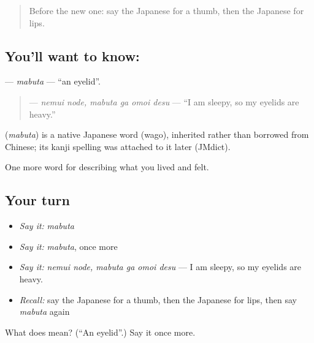 \label{lesson:JA-C443-mabuta}



\begin{quote}
Before the new one: say the Japanese for a thumb, then the Japanese for lips.
\end{quote}

\subsection*{You'll want to know: }
\textbf{} — \emph{mabuta} — \textquotedblleft{}an eyelid\textquotedblright{}.

\begin{quote}
\textbf{ } — \emph{nemui node, mabuta ga omoi desu} — \textquotedblleft{}I am sleepy, so my eyelids are heavy.\textquotedblright{}
\end{quote}

\begin{cousinweb}
\textbf{} (\emph{mabuta}) is a native Japanese word (wago), inherited rather than borrowed from Chinese; its kanji spelling was attached to it later (JMdict).
\end{cousinweb}

\begin{grammarlens}[title={What you've built}]
One more word for describing what you lived and felt.
\end{grammarlens}

\subsection*{Your turn}
\begin{itemize}
\raggedright
  \item \emph{Say it:} \emph{mabuta}
  \item \emph{Say it:} \emph{mabuta}, once more
  \item \emph{Say it:} \emph{nemui node, mabuta ga omoi desu} — I am sleepy, so my eyelids are heavy.
  \item \emph{Recall:} say the Japanese for a thumb, then the Japanese for lips, then say \emph{mabuta} again
\end{itemize}

\begin{tcolorbox}[breakable,colback=teal!4,colframe=teal!35!black,title={Before you move on}]
What does  mean? (\textquotedblleft{}An eyelid\textquotedblright{}.) Say it once more.
\end{tcolorbox}
